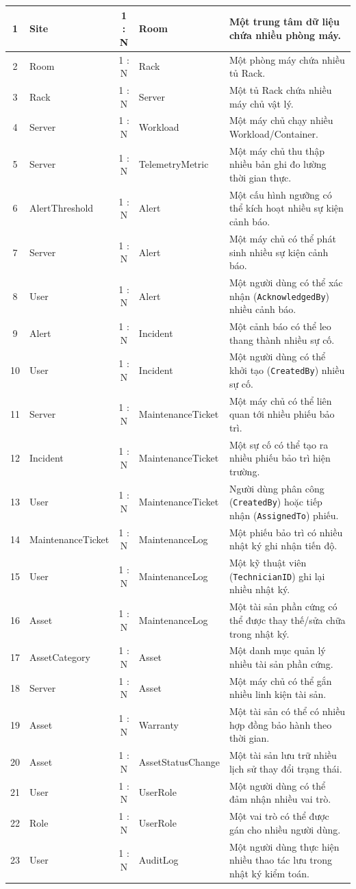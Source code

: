 \begin{longtable}{|c|l|c|l|p{6cm}|}
1 & Site & 1 : N & Room & Một trung tâm dữ liệu chứa nhiều phòng máy. \\ \hline
2 & Room & 1 : N & Rack & Một phòng máy chứa nhiều tủ Rack. \\ \hline
3 & Rack & 1 : N & Server & Một tủ Rack chứa nhiều máy chủ vật lý. \\ \hline
4 & Server & 1 : N & Workload & Một máy chủ chạy nhiều Workload/Container. \\ \hline
5 & Server & 1 : N & TelemetryMetric & Một máy chủ thu thập nhiều bản ghi đo lường thời gian thực. \\ \hline
6 & AlertThreshold & 1 : N & Alert & Một cấu hình ngưỡng có thể kích hoạt nhiều sự kiện cảnh báo. \\ \hline
7 & Server & 1 : N & Alert & Một máy chủ có thể phát sinh nhiều sự kiện cảnh báo. \\ \hline
8 & User & 1 : N & Alert & Một người dùng có thể xác nhận (\texttt{AcknowledgedBy}) nhiều cảnh báo. \\ \hline
9 & Alert & 1 : N & Incident & Một cảnh báo có thể leo thang thành nhiều sự cố. \\ \hline
10 & User & 1 : N & Incident & Một người dùng có thể khởi tạo (\texttt{CreatedBy}) nhiều sự cố. \\ \hline
11 & Server & 1 : N & MaintenanceTicket & Một máy chủ có thể liên quan tới nhiều phiếu bảo trì. \\ \hline
12 & Incident & 1 : N & MaintenanceTicket & Một sự cố có thể tạo ra nhiều phiếu bảo trì hiện trường. \\ \hline
13 & User & 1 : N & MaintenanceTicket & Người dùng phân công (\texttt{CreatedBy}) hoặc tiếp nhận (\texttt{AssignedTo}) phiếu. \\ \hline
14 & MaintenanceTicket & 1 : N & MaintenanceLog & Một phiếu bảo trì có nhiều nhật ký ghi nhận tiến độ. \\ \hline
15 & User & 1 : N & MaintenanceLog & Một kỹ thuật viên (\texttt{TechnicianID}) ghi lại nhiều nhật ký. \\ \hline
16 & Asset & 1 : N & MaintenanceLog & Một tài sản phần cứng có thể được thay thế/sửa chữa trong nhật ký. \\ \hline
17 & AssetCategory & 1 : N & Asset & Một danh mục quản lý nhiều tài sản phần cứng. \\ \hline
18 & Server & 1 : N & Asset & Một máy chủ có thể gắn nhiều linh kiện tài sản. \\ \hline
19 & Asset & 1 : N & Warranty & Một tài sản có thể có nhiều hợp đồng bảo hành theo thời gian. \\ \hline
20 & Asset & 1 : N & AssetStatusChange & Một tài sản lưu trữ nhiều lịch sử thay đổi trạng thái. \\ \hline
21 & User & 1 : N & UserRole & Một người dùng có thể đảm nhận nhiều vai trò. \\ \hline
22 & Role & 1 : N & UserRole & Một vai trò có thể được gán cho nhiều người dùng. \\ \hline
23 & User & 1 : N & AuditLog & Một người dùng thực hiện nhiều thao tác lưu trong nhật ký kiểm toán. \\ \hline
\end{longtable}

